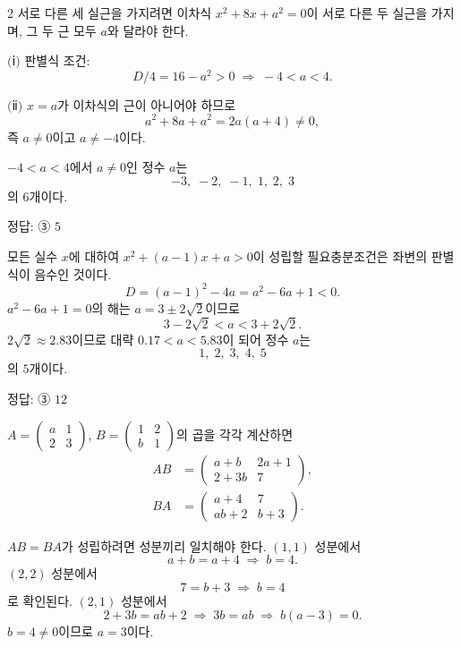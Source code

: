 \documentclass[10pt]{article}
\begin{document}
\begin{multicols}{2}
서로 다른 세 실근을 가지려면 이차식 $x^2 + 8x + a^2 = 0$이 서로 다른 두 실근을 가지며, 그 두 근 모두 $a$와 달라야 한다.

$(\!$ⅰ$)$ 판별식 조건:
\[ D/4 = 16 - a^2 > 0 \;\Rightarrow\; -4 < a < 4. \]

$(\!$ⅱ$)$ $x = a$가 이차식의 근이 아니어야 하므로
\[ a^2 + 8a + a^2 = 2a(a+4) \ne 0, \]
즉 $a \ne 0$이고 $a \ne -4$이다.

$-4 < a < 4$에서 $a \ne 0$인 정수 $a$는
\[ -3,\; -2,\; -1,\; 1,\; 2,\; 3 \]
의 $6$개이다.

\begin{answerbox}정답: ③ $5$\end{answerbox}

모든 실수 $x$에 대하여 $x^2 + (a - 1)x + a > 0$이 성립할 필요충분조건은 좌변의 판별식이 음수인 것이다.
\[ D = (a - 1)^2 - 4a = a^2 - 6a + 1 < 0. \]
$a^2 - 6a + 1 = 0$의 해는 $a = 3 \pm 2\sqrt{2}$이므로
\[ 3 - 2\sqrt{2} < a < 3 + 2\sqrt{2}. \]
$2\sqrt{2} \approx 2.83$이므로 대략 $0.17 < a < 5.83$이 되어 정수 $a$는
\[ 1,\; 2,\; 3,\; 4,\; 5 \]
의 $5$개이다.

\begin{answerbox}정답: ③ $12$\end{answerbox}

$A = \begin{pmatrix} a & 1 \\ 2 & 3 \end{pmatrix}$, $B = \begin{pmatrix} 1 & 2 \\ b & 1 \end{pmatrix}$의 곱을 각각 계산하면
\begin{align*}
AB &= \begin{pmatrix} a + b & 2a + 1 \\ 2 + 3b & 7 \end{pmatrix}, \\
BA &= \begin{pmatrix} a + 4 & 7 \\ ab + 2 & b + 3 \end{pmatrix}.
\end{align*}

$AB = BA$가 성립하려면 성분끼리 일치해야 한다. $(1, 1)$ 성분에서
\[ a + b = a + 4 \;\Rightarrow\; b = 4. \]
$(2, 2)$ 성분에서
\[ 7 = b + 3 \;\Rightarrow\; b = 4 \]
로 확인된다. $(2, 1)$ 성분에서
\[ 2 + 3b = ab + 2 \;\Rightarrow\; 3b = ab \;\Rightarrow\; b(a - 3) = 0. \]
$b = 4 \ne 0$이므로 $a = 3$이다.


\end{multicols}
\end{document}
